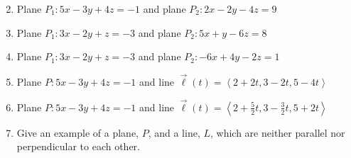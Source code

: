\documentclass[12pt]{article}
\newif\ifans
\begin{document}

\begin{enumerate}
\setcounter{enumi}{1}

\item Plane $P_1:5x-3y+4z=-1$ and plane $P_2: 2x-2y-4z=9$

\ifans{\fbox{The planes are perpendicular.}} \fi

\item Plane $P_1: 3x-2y+z=-3$ and plane $P_2: 5x+y-6z=8$

\ifans{\fbox{The planes are neither parallel nor perpendicular.}} \fi

\item Plane $P_1: 3x-2y+z=-3$ and plane $P_2: -6x+4y-2z=1$

\ifans{\fbox{The planes are parallel.}} \fi

\item Plane $P:5x-3y+4z=-1$ and line $\overrightarrow{\ell}(t)=\left\langle2+2t, 3-2t, 5-4t\right\rangle$

\ifans{\fbox{The plane and the line are parallel.}} \fi

\item Plane $P:5x-3y+4z=-1$ and line $\overrightarrow{\ell}(t)=\left\langle2+\frac{5}{2}t, 3-\frac{3}{2}t, 5+2t\right\rangle$

\ifans{\fbox{The plane and the line are perpendicular.}} \fi

\item Give an example of a plane, $P$, and a line, $L$, which are neither parallel nor perpendicular to each other.

\ifans{\fbox{\parbox{1\linewidth}{Suppose your line has the form $\overrightarrow{\ell}(t)=\overrightarrow{\ell_0}+t\overrightarrow{v}$ and that your plane has $\overrightarrow{n}$ as a normal vector.  Then all possible answers are those for which $\overrightarrow{v} \not\parallel \overrightarrow{n}$ (i.e., $\overrightarrow{v}\neq c\overrightarrow{n}$ for any scalar $c$) and $\overrightarrow{v} \not\perp \overrightarrow{n}$ (i.e., $\overrightarrow{v}\cdot\overrightarrow{n}\neq 0$).  The first condition ensures that $L$ and $P$ are not perpendicular; the second condition ensures that $L$ and $P$ are not parallel.}}} \fi

\end{enumerate}

\end{document}
